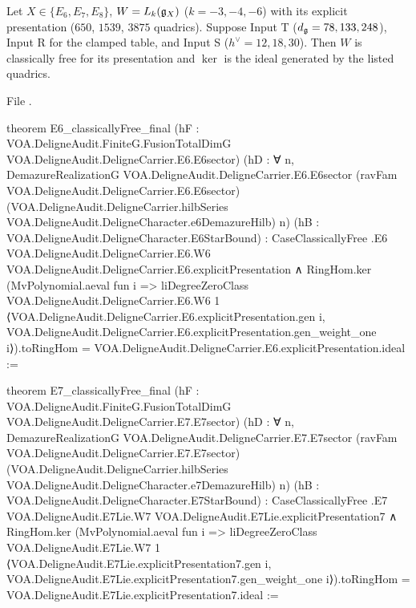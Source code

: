 \begin{theorem}\label{l27:thm:E}
Let $X\in\{E_6,E_7,E_8\}$, $W=L_k(\mathfrak g_X)$ ($k=-3,-4,-6$) with its explicit presentation ($650$, $1539$, $3875$ quadrics).
Suppose Input T ($d_{\mathfrak g}=78,133,248$), Input R for the clamped table, and Input S ($h^\vee=12,18,30$). Then $W$ is classically
free for its presentation and $\ker$ is the ideal generated by the listed quadrics.
\end{theorem}
\noindent File .
\begin{leancode}
theorem E6_classicallyFree_final
    (hF : VOA.DeligneAudit.FiniteG.FusionTotalDimG VOA.DeligneAudit.DeligneCarrier.E6.E6sector)
    (hD : ∀ n, DemazureRealizationG VOA.DeligneAudit.DeligneCarrier.E6.E6sector
      (ravFam VOA.DeligneAudit.DeligneCarrier.E6.E6sector)
      (VOA.DeligneAudit.DeligneCarrier.hilbSeries VOA.DeligneAudit.DeligneCharacter.e6DemazureHilb) n)
    (hB : VOA.DeligneAudit.DeligneCharacter.E6StarBound) :
    CaseClassicallyFree .E6 VOA.DeligneAudit.DeligneCarrier.E6.W6
        VOA.DeligneAudit.DeligneCarrier.E6.explicitPresentation ∧
      RingHom.ker (MvPolynomial.aeval fun i =>
        liDegreeZeroClass VOA.DeligneAudit.DeligneCarrier.E6.W6 1
          ⟨VOA.DeligneAudit.DeligneCarrier.E6.explicitPresentation.gen i,
            VOA.DeligneAudit.DeligneCarrier.E6.explicitPresentation.gen_weight_one i⟩).toRingHom =
        VOA.DeligneAudit.DeligneCarrier.E6.explicitPresentation.ideal :=
\end{leancode}
\begin{leancode}
theorem E7_classicallyFree_final
    (hF : VOA.DeligneAudit.FiniteG.FusionTotalDimG VOA.DeligneAudit.DeligneCarrier.E7.E7sector)
    (hD : ∀ n, DemazureRealizationG VOA.DeligneAudit.DeligneCarrier.E7.E7sector
      (ravFam VOA.DeligneAudit.DeligneCarrier.E7.E7sector)
      (VOA.DeligneAudit.DeligneCarrier.hilbSeries VOA.DeligneAudit.DeligneCharacter.e7DemazureHilb) n)
    (hB : VOA.DeligneAudit.DeligneCharacter.E7StarBound) :
    CaseClassicallyFree .E7 VOA.DeligneAudit.E7Lie.W7 VOA.DeligneAudit.E7Lie.explicitPresentation7 ∧
      RingHom.ker (MvPolynomial.aeval fun i =>
        liDegreeZeroClass VOA.DeligneAudit.E7Lie.W7 1
          ⟨VOA.DeligneAudit.E7Lie.explicitPresentation7.gen i,
            VOA.DeligneAudit.E7Lie.explicitPresentation7.gen_weight_one i⟩).toRingHom =
        VOA.DeligneAudit.E7Lie.explicitPresentation7.ideal :=
\end{leancode}
